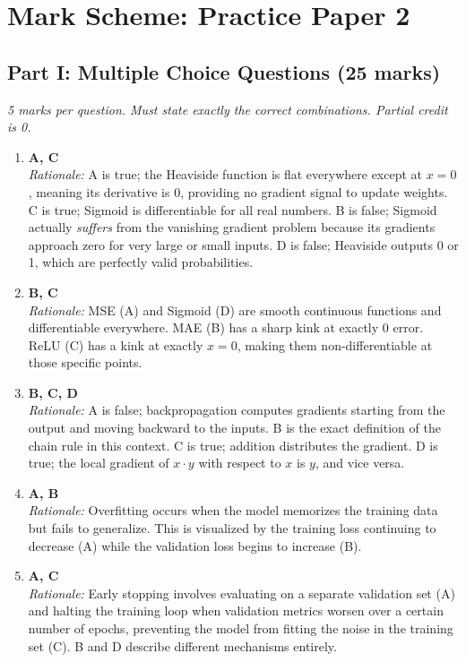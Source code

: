 \documentclass[11pt]{article}
\begin{document}
\newpage

\section*{Mark Scheme: Practice Paper 2}

\subsection*{Part I: Multiple Choice Questions (25 marks)}
\textit{5 marks per question. Must state exactly the correct combinations. Partial credit is 0.}

\begin{enumerate}
    \item \textbf{A, C}\\
    \textit{Rationale:} A is true; the Heaviside function is flat everywhere except at $x=0$, meaning its derivative is $0$, providing no gradient signal to update weights. C is true; Sigmoid is differentiable for all real numbers. B is false; Sigmoid actually \textit{suffers} from the vanishing gradient problem because its gradients approach zero for very large or small inputs. D is false; Heaviside outputs 0 or 1, which are perfectly valid probabilities.

    \item \textbf{B, C}\\
    \textit{Rationale:} MSE (A) and Sigmoid (D) are smooth continuous functions and differentiable everywhere. MAE (B) has a sharp kink at exactly $0$ error. ReLU (C) has a kink at exactly $x=0$, making them non-differentiable at those specific points.

    \item \textbf{B, C, D}\\
    \textit{Rationale:} A is false; backpropagation computes gradients starting from the output and moving backward to the inputs. B is the exact definition of the chain rule in this context. C is true; addition distributes the gradient. D is true; the local gradient of $x \cdot y$ with respect to $x$ is $y$, and vice versa.

    \item \textbf{A, B}\\
    \textit{Rationale:} Overfitting occurs when the model memorizes the training data but fails to generalize. This is visualized by the training loss continuing to decrease (A) while the validation loss begins to increase (B). 

    \item \textbf{A, C}\\
    \textit{Rationale:} Early stopping involves evaluating on a separate validation set (A) and halting the training loop when validation metrics worsen over a certain number of epochs, preventing the model from fitting the noise in the training set (C). B and D describe different mechanisms entirely.
\end{enumerate}
\end{document}
